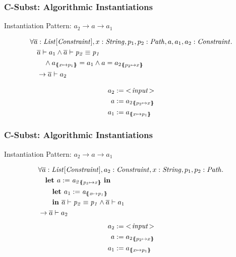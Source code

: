 \begin{frame}[t]
\frametitle{C-Subst: Algorithmic Instantiations}
Instantiation Pattern: $a_2 \rightarrow a \rightarrow a_1$

\begin{align*}
&\forall \overline{a}: \mathit{List[\mathit{Constraint}]}, x: \mathit{String}, p_1, p_2: \mathit{Path}, a, a_1, a_2: \mathit{Constraint}. \\
&\quad \overline{a} \vdash a_1
         \land \overline{a} \vdash \mathit{p_2} \equiv \mathit{p_1}\\
&\qquad  \land a_{\{\mskip-6.9mu\{ x \mapsto p_1 \}\mskip-6.9mu\}} = a_1 \land a = {a_2}_{\{\mskip-6.9mu\{ p_2 \mapsto x \}\mskip-6.9mu\}}\\
&\quad   \rightarrow \overline{a} \vdash a_2
\end{align*}

\begin{align*}
a_2 &:= \mIt{<\!input\!>}\\
a &:= {a_2}_{\sub{p_2}{x}}\\
a_1 &:= a_{\sub{x}{p_1}}
\end{align*}
\end{frame}

\begin{frame}[t]
\frametitle{C-Subst: Algorithmic Instantiations}
Instantiation Pattern: $a_2 \rightarrow a \rightarrow a_1$

\begin{align*}
&\forall \overline{a}: \mathit{List[\mathit{Constraint}]}, a_2: \mathit{Constraint}, x: \mathit{String}, p_1, p_2: \mathit{Path}.\\
&\quad \textbf{let } a := \mathit{a_2}_{\{\mskip-6.9mu\{ \mathit{p_2} \mapsto \mathit{x} \}\mskip-6.9mu\}}\ \textbf{in }\\
&\qquad \textbf{let } a_1 := \mathit{a}_{\{\mskip-6.9mu\{ \mathit{x} \mapsto \mathit{p_1} \}\mskip-6.9mu\}}\\
&\qquad \textbf{in }
        \overline{a} \vdash \mathit{p_2} \equiv \mathit{p_1}
        \land
        \overline{a} \vdash a_1\\
&\rightarrow \overline{a} \vdash a_2
\end{align*}
%
\begin{align*}
a_2 &:= \mIt{<\!input\!>}\\
a &:= {a_2}_{\sub{p_2}{x}}\\
a_1 &:= a_{\sub{x}{p_1}}
\end{align*}
\end{frame}
